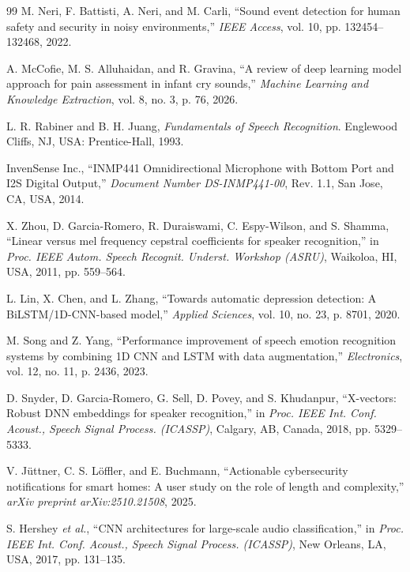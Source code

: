 \documentclass[12pt, a4paper]{report}
\begin{document}
\begin{thebibliography}{99}
M. Neri, F. Battisti, A. Neri, and M. Carli, ``Sound event detection for human safety and security in noisy environments,'' \textit{IEEE Access}, vol. 10, pp. 132454--132468, 2022.

A. McCofie, M. S. Alluhaidan, and R. Gravina, ``A review of deep learning model approach for pain assessment in infant cry sounds,'' \textit{Machine Learning and Knowledge Extraction}, vol. 8, no. 3, p. 76, 2026.

L. R. Rabiner and B. H. Juang, \textit{Fundamentals of Speech Recognition}. Englewood Cliffs, NJ, USA: Prentice-Hall, 1993.

InvenSense Inc., ``INMP441 Omnidirectional Microphone with Bottom Port and I2S Digital Output,'' \textit{Document Number DS-INMP441-00}, Rev. 1.1, San Jose, CA, USA, 2014.

X. Zhou, D. Garcia-Romero, R. Duraiswami, C. Espy-Wilson, and S. Shamma, ``Linear versus mel frequency cepstral coefficients for speaker recognition,'' in \textit{Proc. IEEE Autom. Speech Recognit. Underst. Workshop (ASRU)}, Waikoloa, HI, USA, 2011, pp. 559--564.

L. Lin, X. Chen, and L. Zhang, ``Towards automatic depression detection: A BiLSTM/1D-CNN-based model,'' \textit{Applied Sciences}, vol. 10, no. 23, p. 8701, 2020.

M. Song and Z. Yang, ``Performance improvement of speech emotion recognition systems by combining 1D CNN and LSTM with data augmentation,'' \textit{Electronics}, vol. 12, no. 11, p. 2436, 2023.

D. Snyder, D. Garcia-Romero, G. Sell, D. Povey, and S. Khudanpur, ``X-vectors: Robust DNN embeddings for speaker recognition,'' in \textit{Proc. IEEE Int. Conf. Acoust., Speech Signal Process. (ICASSP)}, Calgary, AB, Canada, 2018, pp. 5329--5333.

V. J\"{u}ttner, C. S. L\"{o}ffler, and E. Buchmann, ``Actionable cybersecurity notifications for smart homes: A user study on the role of length and complexity,'' \textit{arXiv preprint arXiv:2510.21508}, 2025.

S. Hershey \textit{et al.}, ``CNN architectures for large-scale audio classification,'' in \textit{Proc. IEEE Int. Conf. Acoust., Speech Signal Process. (ICASSP)}, New Orleans, LA, USA, 2017, pp. 131--135.


\end{thebibliography}
\end{document}

